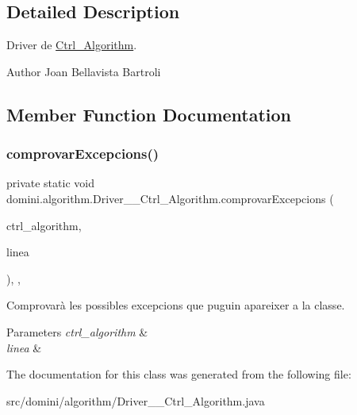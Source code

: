 \subsection{Detailed Description}
Driver de \hyperlink{classdomini_1_1algorithm_1_1Ctrl__Algorithm}{Ctrl\+\_\+\+Algorithm}. 

\begin{DoxyAuthor}{Author}
Joan Bellavista Bartroli 
\end{DoxyAuthor}


\subsection{Member Function Documentation}
\mbox{\label{classdomini_1_1algorithm_1_1Driver____Ctrl__Algorithm_a38ad7761ecde80325d83ce2d2597a61b}} 
\subsubsection{\texorpdfstring{comprovar\+Excepcions()}{comprovarExcepcions()}}
{\footnotesize\ttfamily private static void domini.\+algorithm.\+Driver\+\_\+\+\_\+\+Ctrl\+\_\+\+Algorithm.\+comprovar\+Excepcions (\begin{DoxyParamCaption}\item[{\hyperlink{classdomini_1_1algorithm_1_1Ctrl__Algorithm}{Ctrl\+\_\+\+Algorithm}}]{ctrl\+\_\+algorithm,  }\item[{String}]{linea }\end{DoxyParamCaption})\hspace{0.3cm}{\ttfamily [inline]}, {\ttfamily [static]}, {\ttfamily [private]}}



Comprovarà les possibles excepcions que puguin apareixer a la classe. 


\begin{DoxyParams}{Parameters}
{\em ctrl\+\_\+algorithm} & \\
\hline
{\em linea} & \\
\hline
\end{DoxyParams}


The documentation for this class was generated from the following file\+:\begin{DoxyCompactItemize}
\item 
src/domini/algorithm/Driver\+\_\+\+\_\+\+Ctrl\+\_\+\+Algorithm.\+java\end{DoxyCompactItemize}
